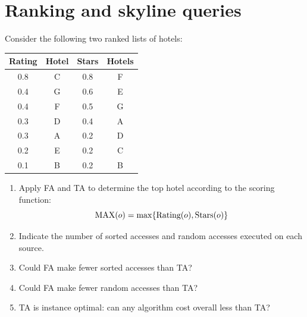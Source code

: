 \documentclass[12pt, a4paper]{report}
\newtheorem[style=M,bodystyle=\normalfont]{theorem}{Theorem}
\newtheorem[style=M,bodystyle=\normalfont]{corollary}{Corollary}
\newtheorem[style=M,bodystyle=\normalfont]{lemma}{Lemma}
\newtheorem[style=M,bodystyle=\normalfont]{definition}{Definition}
\begin{document}
    \newpage 

    \section{Ranking and skyline queries}
        Consider the following two ranked lists of hotels: 
        \begin{table}[H]
            \centering
            \begin{tabular}{cc|cc}
            \hline
            \textbf{Rating} & \textbf{Hotel} & \textbf{Stars} & \textbf{Hotels} \\ \hline
            0.8             & C              & 0.8            & F               \\
            0.4             & G              & 0.6            & E               \\
            0.4             & F              & 0.5            & G               \\
            0.3             & D              & 0.4            & A               \\
            0.3             & A              & 0.2            & D               \\
            0.2             & E              & 0.2            & C               \\
            0.1             & B              & 0.2            & B               \\ \hline
            \end{tabular}
        \end{table}
        \begin{enumerate}
            \item Apply FA and TA to determine the top hotel according to the scoring function: 
                \[\textnormal{MAX}(o) = \max\{\textnormal{Rating}(o), \textnormal{Stars}(o)\}\] 
            \item Indicate the number of sorted accesses and random accesses executed on each source. 
            \item Could FA make fewer sorted accesses than TA?
            \item Could FA make fewer random accesses than TA?
            \item TA is instance optimal: can any algorithm cost overall less than TA?
        \end{enumerate}
\end{document}

